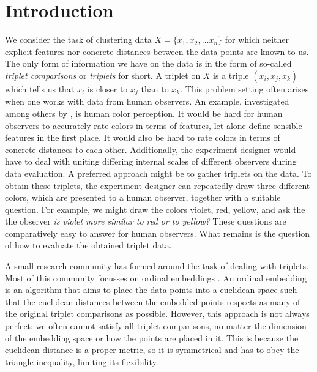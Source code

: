 \chapter{Introduction}\label{Introduction}
We consider the task of clustering data $X = \{x_1, x_2, \ldots x_n \}$ for which neither 
explicit features nor concrete distances between the data points are known to us. 
The only form of information we have on the data is in the form of so-called 
\textit{triplet comparisons} or \textit{triplets} for short. A triplet 
on $X$ is a triple $(x_i, x_j, x_k)$ which tells us that $x_i$ is closer to $x_j$ than to $x_k$. 
This problem setting often arises when one works with data from human observers. 
An example, investigated among others by \citep{shepardAnalysisProximitiesMultidimensional1962}, 
is human color perception. It would be hard for human observers to accurately rate colors in 
terms of features, let alone define sensible features in the first place.  It would also be hard to rate colors in terms of concrete distances to each other.
Additionally, the experiment designer would have to deal with uniting differing internal scales of different observers during data evaluation. 
A preferred approach might be to gather triplets on the data. 
To obtain these triplets, the experiment designer can repeatedly draw
three different colors, which are presented to a human observer, together with a 
suitable question. For example, we might draw the colors violet, red, yellow,
and ask the the observer \textit{is violet more similar to red or to yellow?} These questions
are comparatively easy to answer for human observers. 
What remains is the question of how to evaluate the obtained triplet data.

A small research community has formed around the task of dealing with triplets.
Most of this community focusses on ordinal embeddings
\citep{agarwalGeneralizedNonmetricMultidimensional2007, tamuzAdaptivelyLearningCrowd2011,
laurensvandermaatenStochasticTripletEmbedding2012,   teradaLocalOrdinalEmbedding2014, jainFiniteSamplePrediction2016, ghoshLandmarkOrdinalEmbedding2019, andertonScalingOrdinalEmbedding2019}.
An ordinal embedding is an algorithm that aims to place the data points into a euclidean space
such that the euclidean distances between the embedded points respects as many of the original triplet comparisons as possible. 
However, this approach is not always perfect: we often cannot satisfy all triplet 
comparisons, no matter the dimension of the embedding space or how the points are placed in it.
This is because the euclidean distance is a proper metric, so it is symmetrical and has to obey the triangle inequality, limiting its flexibility. 


